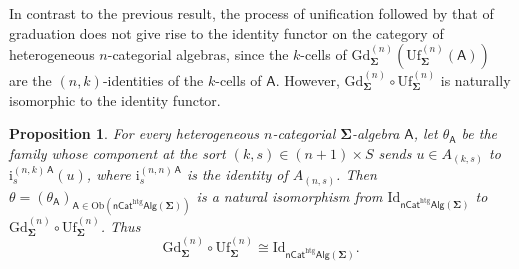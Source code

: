 \documentclass[a4paper, reqno]{amsbook}
\newcommand{\sig}[1]{\mathbf{#1}}             %
\newcommand{\calg}[1]{\boldsymbol{\mathsf{#1}}} %
\newcommand{\htg}{\mathrm{htg}}                %
\newcommand{\Id}{\mathrm{Id}}
\newcommand{\Gd}{\mathrm{Gd}}
\newcommand{\Uf}{\mathrm{Uf}}
\theoremstyle{plain}
\newtheorem{proposition}[theorem]{Proposition}
\theoremstyle{definition}
\begin{document}
In contrast to the previous result, the process of unification followed by that of graduation does not give rise to the identity functor on the category of heterogeneous $n$-categorial algebras, since the $k$-cells of $\Gd^{(n)}_{\sig{\Sigma}}(\Uf^{(n)}_{\sig{\Sigma}}(\calg{A}))$ are the $(n,k)$-identities of the $k$-cells of $\calg{A}$.
However, $\Gd^{(n)}_{\sig{\Sigma}}\circ\Uf^{(n)}_{\sig{\Sigma}}$ is naturally isomorphic to the identity functor.

\begin{proposition}\label{PGdUfIso}
For every heterogeneous $n$-categorial $\sig{\Sigma}$-algebra $\calg{A}$, let $\theta_{\calg{A}}$ be the family whose component at the sort $(k,s)\in(n+1)\times S$ sends $u\in A_{(k,s)}$ to $\mathrm{i}^{(n,k)\,\calg{A}}_{s}(u)$, where $\mathrm{i}^{(n,n)\,\calg{A}}_{s}$ is the identity of $A_{(n,s)}$.
Then $\theta=(\theta_{\calg{A}})_{\calg{A}\in\mathrm{Ob}(\mathsf{nCat}^{\htg}\mathsf{Alg}(\sig{\Sigma}))}$ is a natural isomorphism from $\Id_{\mathsf{nCat}^{\htg}\mathsf{Alg}(\sig{\Sigma})}$ to $\Gd^{(n)}_{\sig{\Sigma}}\circ\Uf^{(n)}_{\sig{\Sigma}}$.
Thus
\[\Gd^{(n)}_{\sig{\Sigma}}\circ\Uf^{(n)}_{\sig{\Sigma}}\cong \Id_{\mathsf{nCat}^{\htg}\mathsf{Alg}(\sig{\Sigma})}.\]
\end{proposition}
\end{document}
